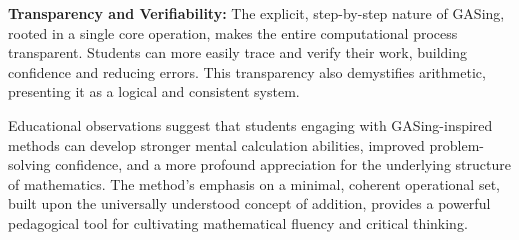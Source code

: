 \noindent\textbf{\textbf{Transparency and Verifiability}:} The explicit, step-by-step nature of GASing, rooted in a single core operation, makes the entire computational process transparent. Students can more easily trace and verify their work, building confidence and reducing errors. This transparency also demystifies arithmetic, presenting it as a logical and consistent system.


Educational observations suggest that students engaging with GASing-inspired methods can develop stronger mental calculation abilities, improved problem-solving confidence, and a more profound appreciation for the underlying structure of mathematics. The method's emphasis on a minimal, coherent operational set, built upon the universally understood concept of addition, provides a powerful pedagogical tool for cultivating mathematical fluency and critical thinking.

